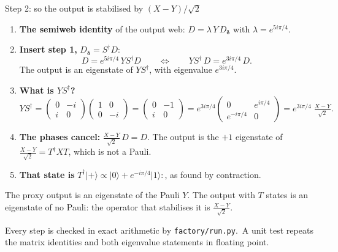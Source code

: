 \documentclass[aspectratio=169,10pt]{beamer}
\newcommand{\ket}[1]{\lvert#1\rangle}
\newcommand{\magic}{\tfrac{X-Y}{\sqrt2}}
\newcommand{\source}[1]{\par\vfill{\fontsize{6}{7}\selectfont\color{black!70}#1\par}}
\newcommand{\checkedref}{Every step is checked in exact arithmetic by \texttt{factory/run.py}.}
\newcommand{\zstate}[1]{\tikz[baseline=-.6ex]{\node[state,fill=zxgreen] (a) at (0,0) {$#1$};\draw (a)--(.95,0);}}
\begin{document}
\begin{frame}{Step 2: so the output is stabilised by $(X-Y)/\sqrt2$}
\small
\begin{enumerate}
\item \textbf{The semiweb identity} of the output web: $D=\lambda\,Y\,D_{\boldsymbol\delta}$ with $\lambda=e^{5i\pi/4}$.
\item \textbf{Insert step 1,} $D_{\boldsymbol\delta}=S^\dagger D$:
\[
 D=e^{5i\pi/4}\,Y S^\dagger D\qquad\Longleftrightarrow\qquad Y S^\dagger\,D=e^{3i\pi/4}\,D .
\]
The output is an eigenstate of $YS^\dagger$, with eigenvalue $e^{3i\pi/4}$.
\item \textbf{What is $YS^\dagger$?}
\[
 YS^\dagger=\begin{pmatrix}0&-i\\ i&0\end{pmatrix}\begin{pmatrix}1&0\\0&-i\end{pmatrix}
 =\begin{pmatrix}0&-1\\ i&0\end{pmatrix}
 =e^{3i\pi/4}\begin{pmatrix}0&e^{i\pi/4}\\ e^{-i\pi/4}&0\end{pmatrix}
 =e^{3i\pi/4}\;\magic .
\]
\item \textbf{The phases cancel:} $\magic\,D=D$. The output is the $+1$ eigenstate of $\magic=T^\dagger XT$, which is not a Pauli.
\item \textbf{That state is} $T^\dagger\ket+\propto\ket0+e^{-i\pi/4}\ket1$:\quad\zstate{\text{-}\frac{\pi}{4}}\,, as found by contraction.
\end{enumerate}
The proxy output is an eigenstate of the Pauli $Y$. The output with $T$ states is an eigenstate of no Pauli: the operator that stabilises it is $\magic$.
\source{\checkedref\ A unit test repeats the matrix identities and both eigenvalue statements in floating point.}
\end{frame}
\end{document}
